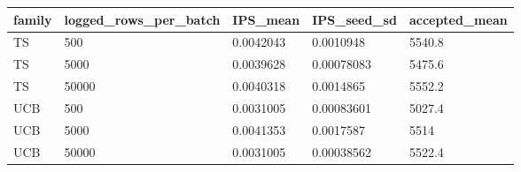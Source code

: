 \begin{tabular}{lllll}
\hline
family & logged\_rows\_per\_batch & IPS\_mean & IPS\_seed\_sd & accepted\_mean \\
\hline
TS & 500 & 0.0042043 & 0.0010948 & 5540.8 \\
TS & 5000 & 0.0039628 & 0.00078083 & 5475.6 \\
TS & 50000 & 0.0040318 & 0.0014865 & 5552.2 \\
UCB & 500 & 0.0031005 & 0.00083601 & 5027.4 \\
UCB & 5000 & 0.0041353 & 0.0017587 & 5514 \\
UCB & 50000 & 0.0031005 & 0.00038562 & 5522.4 \\
\hline
\end{tabular}